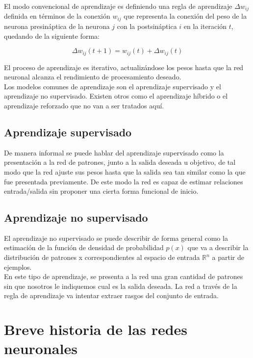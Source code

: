 El modo convencional de aprendizaje es definiendo una regla de
aprendizaje $\Delta w_{ij}$ definida en términos de la conexión
$w_{ij}$ que representa la conexión del peso de la neurona
presináptica de la neurona $j$ con la postsináptica $i$ en la
iteración $t$, quedando de la siguiente forma:

\begin{equation}
  \Delta w_{ij}(t+1) = w_{ij}(t) + \Delta w_{ij}(t)
\end{equation}

El proceso de aprendizaje es iterativo, actualizándose los pesos hasta
que la red neuronal alcanza el rendimiento de procesamiento deseado.\\

Los modelos comunes de aprendizaje son el aprendizaje supervisado y el
aprendizaje no supervisado. Existen otros como el aprendizaje híbrido
o el aprendizaje reforzado que no van a ser tratados aquí.

\subsection{Aprendizaje supervisado}

De manera informal se puede hablar del aprendizaje supervisado como la
presentación a la red de patrones, junto a la salida deseada u
objetivo, de tal modo que la red ajuste sus pesos hasta que la salida
sea tan similar como la que fue presentada previamente. De este modo
la red es capaz de estimar relaciones entrada/salida sin proponer una
cierta forma funcional de inicio.

\subsection{Aprendizaje no supervisado}

El aprendizaje no supervisado se puede describir de forma general como
la estimación de la función de densidad de probabilidad $p(x)$ que va
a describir la distribución de patrones x correspondientes al espacio
de entrada $\mathbb{R}^n$ a partir de ejemplos. \\

En este tipo de aprendizaje, se presenta a la red una gran cantidad de
patrones sin que nosotros le indiquemos cual es la salida deseada. La
red a través de la regla de aprendizaje va intentar extraer rasgos del conjunto de entrada.

\section{Breve historia de las redes neuronales}

